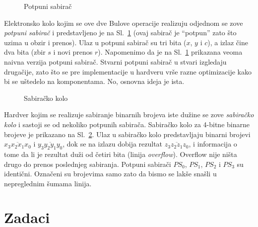 \begin{figure}
  \centering
  
  \caption{Potpuni sabira\v c}
  \label{01-polusab}
\end{figure}

Elektronsko kolo kojim se ove dve Bulove operacije realizuju odjednom
se zove \emph{potpuni sabira\v c} i predstavljeno je na Sl.~\ref{01-polusab}
(ovaj sabira\v c je \enquote{potpun} zato \v sto uzima u obzir i prenos).
Ulaz u potpuni sabira\v c su tri bita ($x$, $y$ i $c$), a izlaz \v cine dva bita
(zbir $s$ i novi prenos $r$). Napomenimo da je
na Sl.~\ref{01-polusab} prikazana veoma naivna verzija potpuni sabira\v c. Stvarni
potpuni sabira\v c u stvari izgledaju druga\v cije, zato \v sto se pre
implementacije u hardveru vr\v se razne optimizacije kako bi se
u\v stedelo na komponentama. No, osnovna ideja je ista.

\begin{figure}
  \centering
  
  \caption{Sabira\v cko kolo}
  \label{01-sab}
\end{figure}

Hardver kojim se realizuje sabiranje binarnih brojeva iste du\v zine
se zove \emph{sabira\v cko kolo} i sastoji se od nekoliko potpunih sabira\v ca.
Sabira\v cko kolo za 4-bitne binarne brojeve je prikazano na Sl.~\ref{01-sab}. Ulaz
u sabira\v cko kolo predstavljaju binarni brojevi $\overline{x_3 x_2 x_1 x_0}$ i
$\overline{y_3 y_2 y_1 y_0}$, dok se na izlazu dobija rezultat
$\overline{z_3 z_2 z_1 z_0}$, i informacija o tome da li je rezultat
du\v zi od \v cetiri bita (linija \emph{overflow}). Overflow nije ni\v sta
drugo do prenos poslednjeg sabiranja. Potpuni sabira\v ci $PS_0$, $PS_1$,
$PS_2$ i $PS_3$ su identi\v cni. Ozna\v ceni su brojevima samo zato da
bismo se lak\v se sna\v sli u nepreglednim \v sumama linija.

\section{Zadaci}

